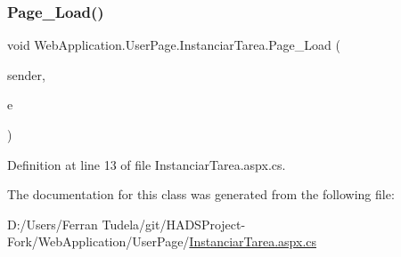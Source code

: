 \subsubsection{\texorpdfstring{Page\_Load()}{Page\_Load()}}
{\footnotesize\ttfamily void Web\+Application.\+User\+Page.\+Instanciar\+Tarea.\+Page\+\_\+\+Load (\begin{DoxyParamCaption}\item[{object}]{sender,  }\item[{Event\+Args}]{e }\end{DoxyParamCaption})\hspace{0.3cm}{\ttfamily [protected]}}



Definition at line 13 of file Instanciar\+Tarea.\+aspx.\+cs.



The documentation for this class was generated from the following file\+:\begin{DoxyCompactItemize}
\item 
D\+:/\+Users/\+Ferran Tudela/git/\+H\+A\+D\+S\+Project-\/\+Fork/\+Web\+Application/\+User\+Page/\mbox{\hyperlink{InstanciarTarea_8aspx_8cs}{Instanciar\+Tarea.\+aspx.\+cs}}\end{DoxyCompactItemize}

